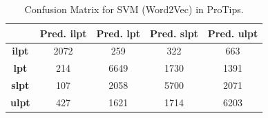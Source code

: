 \documentclass[11pt,a4paper]{article}
\begin{document}
\begin{table}[h!]
\centering
\begin{tabular}{c|c|c|c|c|}
\cline{2-5}
                                                            & \cellcolor[HTML]{EFEFEF}\textbf{Pred. ilpt} & \cellcolor[HTML]{EFEFEF}\textbf{Pred. lpt} & \cellcolor[HTML]{EFEFEF}\textbf{Pred. slpt} & \cellcolor[HTML]{EFEFEF}\textbf{Pred. ulpt} \\ \hline
\multicolumn{1}{|c|}{\cellcolor[HTML]{EFEFEF}\textbf{ilpt}} & 2072                                        & 259                                        & 322                                         & 663                                         \\ \hline
\multicolumn{1}{|c|}{\cellcolor[HTML]{EFEFEF}\textbf{lpt}}  & 214                                         & 6649                                       & 1730                                        & 1391                                        \\ \hline
\multicolumn{1}{|c|}{\cellcolor[HTML]{EFEFEF}\textbf{slpt}} & 107                                         & 2058                                       & 5700                                        & 2071                                        \\ \hline
\multicolumn{1}{|c|}{\cellcolor[HTML]{EFEFEF}\textbf{ulpt}} & 427                                         & 1621                                       & 1714                                        & 6203                                        \\ \hline
\end{tabular}
\caption{Confusion Matrix for SVM (Word2Vec) in ProTips.}
\label{table:svm1_w2v}
\end{table}
\end{document}
